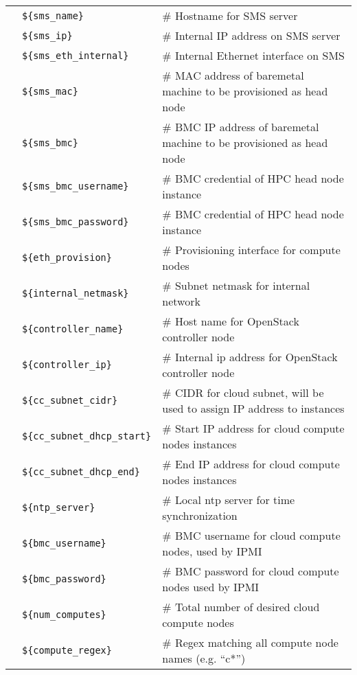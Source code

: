 \vspace*{0.2cm}
\begin{tabular}{@{}>{\textbullet}l p{5.5cm} l}
& \texttt{\$\{sms\_name\}} & {\small \# Hostname for SMS server} \\
& \texttt{\$\{sms\_ip\}} & {\small \# Internal IP address on SMS server}  \\
& \texttt{\$\{sms\_eth\_internal\}} & {\small \# Internal Ethernet interface on SMS} \\
& \texttt{\$\{sms\_mac\}} & {\small \# MAC address of baremetal machine to be provisioned as head node} \\
& \texttt{\$\{sms\_bmc\}} & {\small \# BMC IP address of baremetal machine to be provisioned as head node} \\
& \texttt{\$\{sms\_bmc\_username\}} & {\small \# BMC credential of HPC head node instance} \\
& \texttt{\$\{sms\_bmc\_password\}} & {\small \# BMC credential of HPC head node instance} \\
& \texttt{\$\{eth\_provision\}} & {\small \# Provisioning interface for compute nodes} \\
& \texttt{\$\{internal\_netmask\}} & {\small \# Subnet netmask for internal network} \\
& \texttt{\$\{controller\_name\}} & {\small \# Host name for OpenStack controller node} \\
& \texttt{\$\{controller\_ip\}} & {\small \# Internal ip address for OpenStack controller node} \\
& \texttt{\$\{cc\_subnet\_cidr\}} & {\small \# CIDR for cloud subnet, will be used to assign IP address to instances } \\
& \texttt{\$\{cc\_subnet\_dhcp\_start\}} & {\small \# Start IP address for cloud compute nodes instances} \\
& \texttt{\$\{cc\_subnet\_dhcp\_end\}} & {\small \# End IP address for cloud compute nodes instances} \\
& \texttt{\$\{ntp\_server\}} & {\small \# Local ntp server for time synchronization} \\
& \texttt{\$\{bmc\_username\}} & {\small \# BMC username for cloud compute nodes, used by IPMI} \\
& \texttt{\$\{bmc\_password\}} & {\small \# BMC password for cloud compute nodes used by IPMI} \\
& \texttt{\$\{num\_computes\}} & {\small \# Total number of desired cloud compute nodes} \\
& \texttt{\$\{compute\_regex\}} & {\small \# Regex matching all compute node names (e.g. ``c*'')} \\

\end{tabular}
